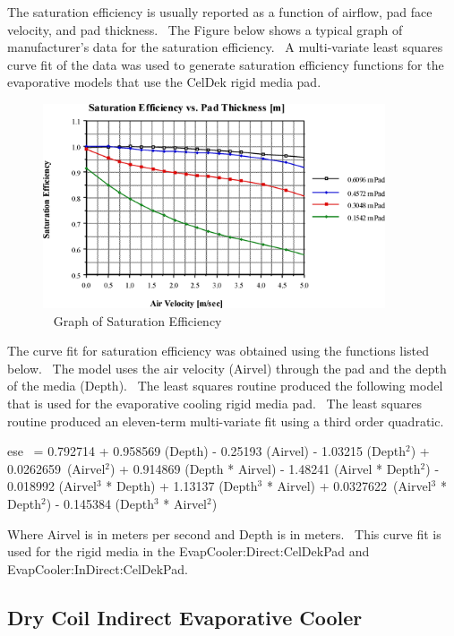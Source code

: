 The saturation efficiency is usually reported as a function of airflow, pad face velocity, and pad thickness.~ The Figure below shows a typical graph of manufacturer's data for the saturation efficiency.~ A multi-variate least squares curve fit of the data was used to generate saturation efficiency functions for the evaporative models that use the CelDek rigid media pad.

\begin{figure}[hbtp] %
\centering
\includegraphics[width=0.9\textwidth, height=0.9\textheight, keepaspectratio=true]{media/image4793.png}
\caption{  Graph of Saturation Efficiency \protect \label{fig:graph-of-saturation-efficiency}}
\end{figure}

The curve fit for saturation efficiency was obtained using the functions listed below.~ The model uses the air velocity (Airvel) through the pad and the depth of the media (Depth).~ The least squares routine produced the following model that is used for the evaporative cooling rigid media pad.~ The least squares routine produced an eleven-term multi-variate fit using a third order quadratic.

ese~ = 0.792714 + 0.958569 (Depth) - 0.25193 (Airvel) - 1.03215 (Depth\(^{2}\)) + 0.0262659~(Airvel\(^{2}\)) + 0.914869 (Depth * Airvel) - 1.48241 (Airvel * Depth\(^{2}\)) - 0.018992 (Airvel\(^{3}\) * Depth) + 1.13137 (Depth\(^{3}\) * Airvel) + 0.0327622~(Airvel\(^{3}\) * Depth\(^{2}\)) - 0.145384 (Depth\(^{3}\) * Airvel\(^{2}\))

Where Airvel is in meters per second and Depth is in meters.~ This curve fit is used for the rigid media in the EvapCooler:Direct:CelDekPad and EvapCooler:InDirect:CelDekPad.

\subsection{Dry Coil Indirect Evaporative Cooler}\label{dry-coil-indirect-evaporative-cooler}


